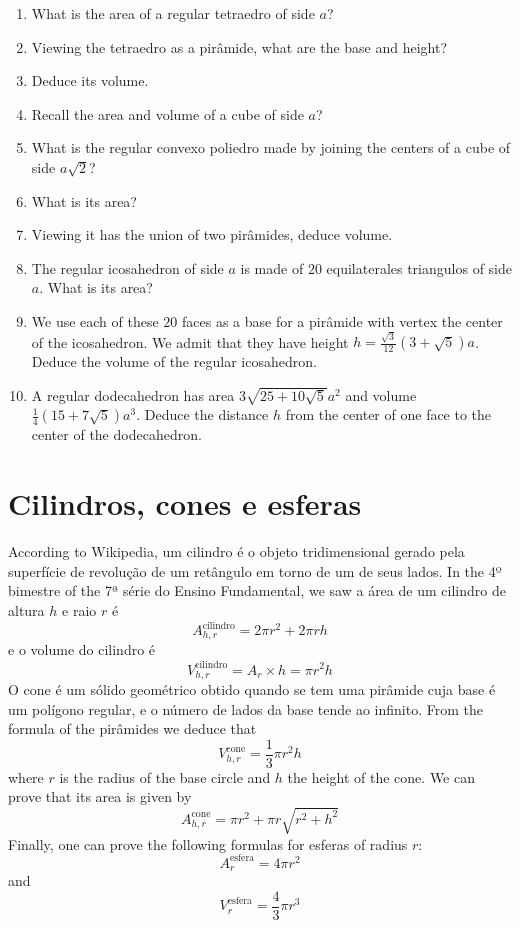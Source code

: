 \begin{enumerate}

\item What is the area of a regular tetraedro of side $a$?
\item Viewing the tetraedro as a pirâmide, what are the base and height?
\item Deduce its volume.
\item Recall the area and volume of a cube of side $a$?
\item What is the regular convexo poliedro made by joining
  the centers of a cube of side $a \sqrt{2}$?
\item What is its area?
\item Viewing it has the union of two pirâmides, deduce volume.
\item The regular icosahedron of side $a$ is made of $20$ equilaterales
  triangulos
  of side $a$. What is its area?
\item We use each of these $20$ faces as a base for a pirâmide with vertex
  the center of the icosahedron. We admit that they have height
  $h = \frac{\sqrt{3}}{12} \left(3+\sqrt{5}\right) a$. Deduce the volume
  of the regular icosahedron.
\item A regular dodecahedron
  has area $3 \sqrt{25+10\sqrt{5}}a^2$ and
  volume $\frac{1}{4} \left(15+7\sqrt{5}\right) a^3$.
  Deduce the distance $h$ from the center of one face to the center of the
  dodecahedron.
\end{enumerate}


\section{Cilindros, cones e esferas}

According to Wikipedia, um cilindro é o objeto tridimensional gerado pela
superfície de revolução de um retângulo em torno de um de seus lados.
In the 4º bimestre of the 7ª série do Ensino Fundamental, we saw
a área de um cilindro de altura $h$ e raio $r$ é
%
$$A_{h,r}^{\text{cilindro}} = {2 \pi r^2} + {2\pi r h}$$
%
e o volume do cilindro é
%
$$V_{h,r}^{\text{cilindro}} = A_{r} \times h = \pi r^2 h$$
%
O cone é um sólido geométrico obtido quando se tem uma pirâmide cuja base é um
polígono regular, e o número de lados da base tende ao infinito. From the
formula of the pirâmides we deduce that
%
$$V_{h,r}^{\text{cone}} = \frac{1}{3} \pi r^2 h$$
%
where $r$ is the radius of the base circle and $h$ the height of the cone.
We can prove that its area is given by
%
$$A_{h,r}^{\text{cone}} = \pi r^2 + {\pi r \sqrt{r^2+h^2}}$$
%
Finally, one can prove the following formulas for esferas of radius $r$:
%
$$A_{r}^{\text{esfera}} = 4 \pi r^2$$
%
and
%
$$V_{r}^{\text{esfera}} = \frac{4}{3} \pi r^3$$
%

